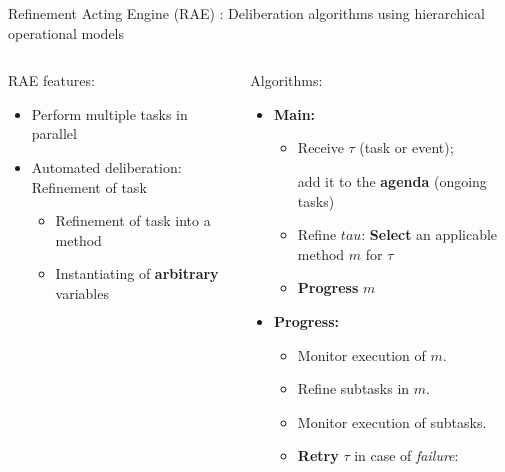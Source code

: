 \begin{frame}{Refinement Acting Engine (RAE)\cite{ghallabAutomatedPlanningActing2016} : Deliberation algorithms using hierarchical operational models}
\begin{columns}
    \begin{column}{0.35\textwidth}
    \pause
    \setlength{\leftmargini}{-1pt}
    RAE features:
    \small
    \begin{itemize}
        \item Perform multiple tasks in parallel
        \pause
        \item Automated deliberation: Refinement of task
        \begin{itemize}
            \setlength{\leftmargini}{-1pt}
            \pause
            \item Refinement of task into a method
            \pause
            \item Instantiating of \textbf{arbitrary} variables
        \end{itemize}
    \end{itemize}
    \end{column}
    \begin{column}{0.65\textwidth}
        
        \pause
        Algorithms:
        \small
        \pause
        \begin{itemize}
            \setlength{\leftmargini}{-1pt}
            \item \textbf{Main:} 
            \begin{itemize}
                \item Receive $\tau$ (task or event);
                
                add it to the \textbf{agenda} (ongoing tasks)
                \pause
                \item Refine $tau$: \textbf{Select} an applicable method $m$ for $\tau$
                \pause
                \item \textbf{Progress} $m$
            \end{itemize}
            \pause
            \item \textbf{Progress:}
                \begin{itemize}
                \pause
                    \item Monitor execution of $m$.
                \pause
                    \item Refine subtasks in $m$.    
                \pause
                    \item Monitor execution of subtasks.
                \pause
                    \item \textbf{Retry} $\tau$ in case of \emph{failure}:
                

\end{itemize}
\end{itemize}
\end{column}
\end{columns}
\end{frame}
